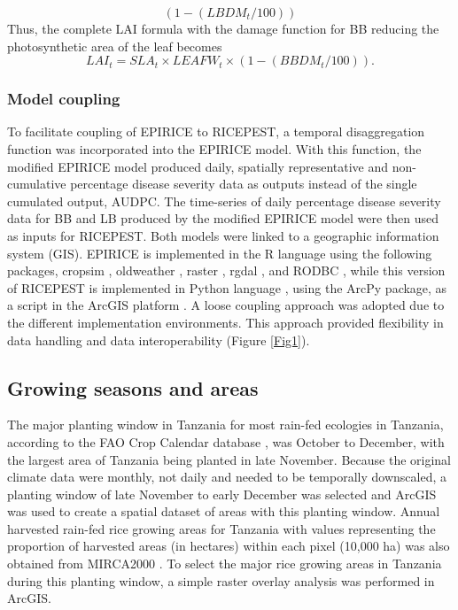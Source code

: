     \begin{equation}
    (1-(LBDM_t /100))
    \label{LBDM}
    \end{equation}
    Thus, the complete LAI formula with the damage function for BB reducing the photosynthetic area of the leaf becomes
     \begin{equation}
    LAI_t = SLA_t \times LEAFW_t \times (1-(BBDM_t / 100)).
    \label{LAIBBDM}
    \end{equation}
    
    \subsubsection{Model coupling}
    \label{model_coupling}
    To facilitate coupling of EPIRICE to RICEPEST, a temporal disaggregation function was incorporated into the EPIRICE model. With this function, the modified EPIRICE model produced daily, spatially representative and non-cumulative percentage disease severity data as outputs instead of the single cumulated output, AUDPC. The time-series of daily percentage disease severity data for BB and LB produced by the modified EPIRICE model were then used as inputs for RICEPEST. Both models were linked to a geographic information system (GIS). EPIRICE is implemented in the R language using the following packages, cropsim \citep{Hijmans2009}, oldweather \citep{Hijmans2009}, raster \citep{Hijmans2014}, rgdal \citep{Bivand2014}, and RODBC \citep{Ripley2013}, while this version of RICEPEST is implemented in Python language \citep{python}, using the ArcPy package, as a script in the ArcGIS platform \citep{ESRI2011}. A loose coupling approach was adopted due to the different implementation environments. This approach provided flexibility in data handling and data interoperability (Figure \ref{Fig1}).
        
    \subsection{Growing seasons and areas}
    \label{growings_seasons}
    The major planting window in Tanzania for most rain-fed ecologies in Tanzania, according to the FAO Crop Calendar database \citep{FAOCropCalendar}, was October to December, with the largest area of Tanzania being planted in late November. Because the original climate data were monthly, not daily and needed to be temporally downscaled, a planting window of late November to early December was selected and ArcGIS was used to create a spatial dataset of areas with this planting window. Annual harvested rain-fed rice growing areas for Tanzania with values representing the proportion of harvested areas (in hectares) within each pixel (10,000 ha) was also obtained from MIRCA2000 \citep{Portmann2010}. To select the major rice growing areas in Tanzania during this planting window, a simple raster overlay analysis was performed in ArcGIS.
    
